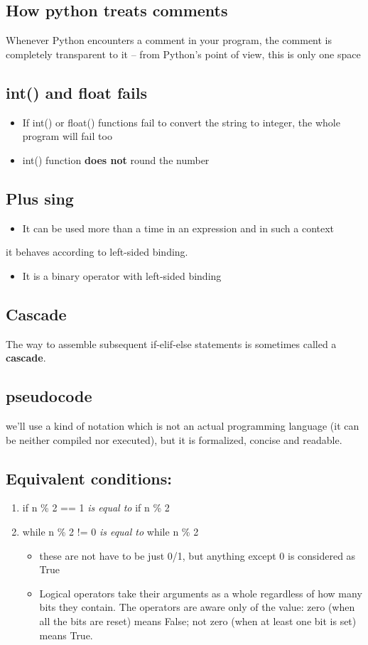 \documentclass[11pt]{article}
\begin{document}
\subsection{How python treats comments}
\label{sec:org9f02660}
Whenever Python encounters a comment in your program, the comment is
completely transparent to it – from Python’s point of view, this is
only one space
\subsection{int() and float fails}
\label{sec:orgfd064b8}
\begin{itemize}
\item If int() or float() functions fail to convert the string to integer,
the whole program will fail too
\item int() function \textbf{does not} round the number
\end{itemize}
\subsection{Plus sing}
\label{sec:orge7a17ed}
\begin{itemize}
\item It can be used more than a time in an expression and in such a context
\end{itemize}
it behaves according to left-sided binding.
\begin{itemize}
\item It is a binary operator with left-sided binding
\end{itemize}
\subsection{Cascade}
\label{sec:orga516796}
The way to assemble subsequent if-elif-else statements is sometimes
called a \textbf{cascade}.
\subsection{pseudocode}
\label{sec:org224ec2a}
we’ll use a kind of notation which is not an actual programming
language (it can be neither compiled nor executed), but it is
formalized, concise and readable.
\subsection{Equivalent conditions:}
\label{sec:org467ec0d}
\begin{enumerate}
\item if n \% 2 == 1  \emph{is equal to} if n \% 2
\item while n \% 2 != 0 \emph{is equal to} while n \% 2
\begin{itemize}
\item these are not have to be just 0/1, but anything except 0 is
considered as True
\item Logical operators take their arguments as a whole regardless of
how many bits they contain. The operators are aware only of the
value: zero (when all the bits are reset) means False; not zero
(when at least one bit is set) means True.
\end{itemize}
\end{enumerate}
\end{document}
